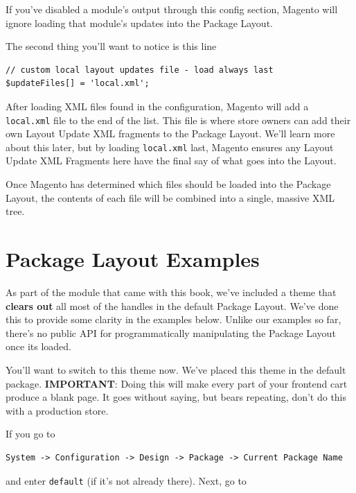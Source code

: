 \documentclass[oneside]{book}
\begin{document}
If you've disabled a module's output through this config section, Magento will ignore loading that module's updates into the Package Layout.  

The second thing you'll want to notice is this line

\begin{lstlisting}
// custom local layout updates file - load always last
$updateFiles[] = 'local.xml';       

\end{lstlisting}


After loading XML files found in the configuration, Magento will add a \footnotesize\texttt{local.xml} \normalsize  file to the end of the list.  This file is where store owners can add their own Layout Update XML fragments to the Package Layout. We'll learn more about this later, but by loading \footnotesize\texttt{local.xml} \normalsize  last, Magento ensures any Layout Update XML Fragments here have the final say of what goes into the Layout.

Once Magento has determined which files should be loaded into the Package Layout, the contents of each file will be combined into a single, massive XML tree. 

\section{Package Layout Examples}

As part of the module that came with this book, we've included a theme that \textbf{clears out} all most of the handles in the default Package Layout.  We've done this to provide some clarity in the examples below.  Unlike our examples so far, there's no public API for programmatically manipulating the Package Layout once its loaded.

You'll want to switch to this theme now.  We've placed this theme in the default package.  \textbf{IMPORTANT}: Doing this will make every part of your frontend cart produce a blank page.  It goes without saying, but bears repeating, don't do this with a production store.

If you go to 

\begin{lstlisting}
System -> Configuration -> Design -> Package -> Current Package Name

\end{lstlisting}


and enter \footnotesize\texttt{default} \normalsize  (if it's not already there).  Next, go to 
\end{document}
